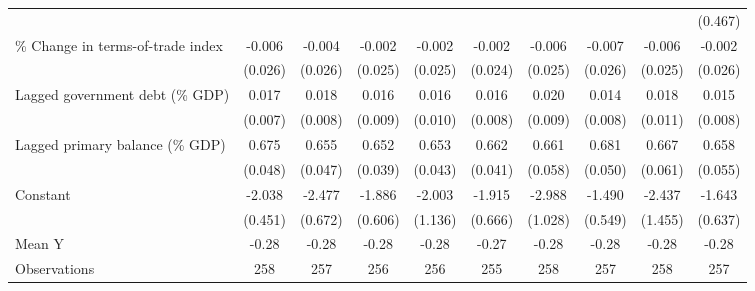 {\begin{tabular}{l*{9}{c}}
                    &                     &                     &                     &                     &                     &                     &                     &                     &     (0.467)         \\
\addlinespace
\% Change in terms-of-trade index&      -0.006         &      -0.004         &      -0.002         &      -0.002         &      -0.002         &      -0.006         &      -0.007         &      -0.006         &      -0.002         \\
                    &     (0.026)         &     (0.026)         &     (0.025)         &     (0.025)         &     (0.024)         &     (0.025)         &     (0.026)         &     (0.025)         &     (0.026)         \\
\addlinespace
Lagged government debt (\% GDP)&       0.017\sym{**} &       0.018\sym{**} &       0.016\sym{*}  &       0.016         &       0.016\sym{*}  &       0.020\sym{**} &       0.014\sym{*}  &       0.018         &       0.015\sym{*}  \\
                    &     (0.007)         &     (0.008)         &     (0.009)         &     (0.010)         &     (0.008)         &     (0.009)         &     (0.008)         &     (0.011)         &     (0.008)         \\
\addlinespace
Lagged primary balance (\% GDP)&       0.675\sym{***}&       0.655\sym{***}&       0.652\sym{***}&       0.653\sym{***}&       0.662\sym{***}&       0.661\sym{***}&       0.681\sym{***}&       0.667\sym{***}&       0.658\sym{***}\\
                    &     (0.048)         &     (0.047)         &     (0.039)         &     (0.043)         &     (0.041)         &     (0.058)         &     (0.050)         &     (0.061)         &     (0.055)         \\
\addlinespace
Constant            &      -2.038\sym{***}&      -2.477\sym{***}&      -1.886\sym{***}&      -2.003         &      -1.915\sym{**} &      -2.988\sym{**} &      -1.490\sym{**} &      -2.437         &      -1.643\sym{**} \\
                    &     (0.451)         &     (0.672)         &     (0.606)         &     (1.136)         &     (0.666)         &     (1.028)         &     (0.549)         &     (1.455)         &     (0.637)         \\
\midrule
Mean Y              &       -0.28         &       -0.28         &       -0.28         &       -0.28         &       -0.27         &       -0.28         &       -0.28         &       -0.28         &       -0.28         \\
Observations        &         258         &         257         &         256         &         256         &         255         &         258         &         257         &         258         &         257         \\
\bottomrule
\end{tabular}
}
